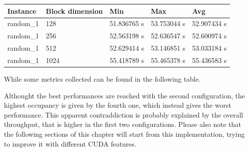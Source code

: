 \documentclass[12pt]{extarticle}
\begin{document}
\begin{center}
\begin{tabular}{ | m{2.2cm} | m{3.2cm} | m{2.2cm} | m{2.2cm} | m{2.2cm} |}
 \hline
 Instance & Block dimension & Min & Max & Avg\\
 \hline
 random\_1 & 128 & 51.836765 s & 53.753044 s & 52.907434 s\\
 \hline
 random\_1 & 256 & 52.563198 s & 52.636547 s & 52.600974 s\\
 \hline
 random\_1 & 512 & 52.629414 s & 53.146851 s & 53.033184 s\\
 \hline
 random\_1 & 1024 & 55.418789 s & 55.465378 s & 55.436583 s\\
 \hline
 \end{tabular}
 \end{center}
 While some metrics collected can be found in the following table.
\begin{center}
\noindent%
\end{center}
Althought the best performances are reached with the second configuration, the highest occupancy is given by the fourth one, which instead gives the worst performance. This apparent contraddiction is probably explained by the overall throughput, that is higher in the first two configurations.\newline
Please also note that the following sections of this chapter will start from this implementation, trying to improve it with different CUDA features.
\end{document}

